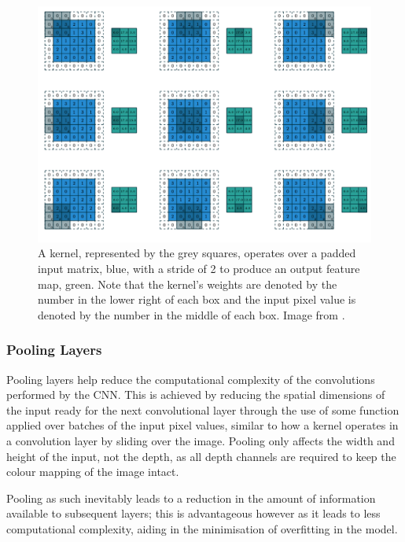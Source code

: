 \begin{figure}
	\begin{center}
		\includegraphics[width=\linewidth]{Chapter2/figs/kernel.png}
	\end{center}
	\caption[A kernel, represented by the grey squares, operates over a padded input matrix, blue, with a stride of 2 to produce an output feature map, green.]{A kernel, represented by the grey squares, operates over a padded input matrix, blue, with a stride of 2 to produce an output feature map, green. Note that the kernel's weights are denoted by the number in the lower right of each box and the input pixel value is denoted by the number in the middle of each box. Image from \cite{dumoulin_160307285_2018}.}
	\label{fig:kernels}
\end{figure}


\subsubsection{Pooling Layers}\label{ch:Background,sec:CNN,sub:CNN,subsubsec:pooling}

Pooling layers help reduce the computational complexity of the convolutions performed by the CNN. This is achieved by reducing the spatial dimensions of the input ready for the next convolutional layer through the use of some function applied over batches of the input pixel values, similar to how a kernel operates in a convolution layer by sliding over the image. Pooling only affects the width and height of the input, not the depth, as all depth channels are required to keep the colour mapping of the image intact. 

Pooling as such inevitably leads to a reduction in the amount of information available to subsequent layers; this is advantageous however as it leads to less computational complexity, aiding in the minimisation of overfitting in the model. 

